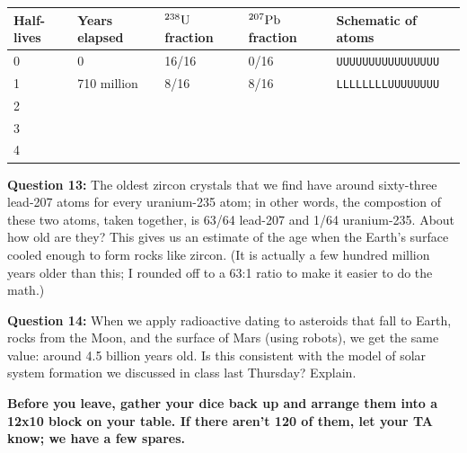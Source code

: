 \documentclass[11pt]{article}
\begin{document}
\Large
\begin{tabular}{|l|l|l|l|l|}
\hline
Half-lives & Years elapsed & ${}^{238}\rm U$ fraction & ${}^{207}\rm Pb$ fraction & Schematic of atoms                          \\ \hline
0                                   & 0                              & 16/16                                            & 0/16                                          & {\tt UUUUUUUUUUUUUUUU} \\\hline
1                                   & 710 million                    & 8/16                                             & 8/16                                          & {\tt LLLLLLLLUUUUUUUU} \\\hline
2                                   &                                &                                                  &                                               &                                             \\\hline
3                                   &                                &                                                  &                                               &                                             \\\hline
4                                   &                                &                                                  &                                               &                                             \\\hline
\end{tabular}

\normalsize\vspace{1.5in}

{\bf Question 13:} The oldest zircon crystals that we find have around sixty-three lead-207 atoms for every uranium-235 atom; in other words, the
compostion of these two atoms, taken together, is 63/64 lead-207 and 1/64 uranium-235.
 About how old are they? This gives us an estimate of the age when the Earth's surface cooled enough to form rocks like 
zircon. (It is actually a few hundred million years older than this; I rounded off to a 63:1 ratio to make it easier to do the math.)

\vspace{1.2in}

{\bf Question 14:} When we apply radioactive dating to asteroids that fall to Earth, rocks from the Moon, and the surface of Mars (using robots), we get the same value: around 4.5 billion years old. Is this consistent with the model of 
solar system formation we discussed in class last Thursday? Explain.

\vspace{1.5in}

{\bf Before you leave, gather your dice back up and arrange them into a 12x10 block on your table. If there aren't 120 of them, let your TA know; we have a few spares.}
\end{document}
